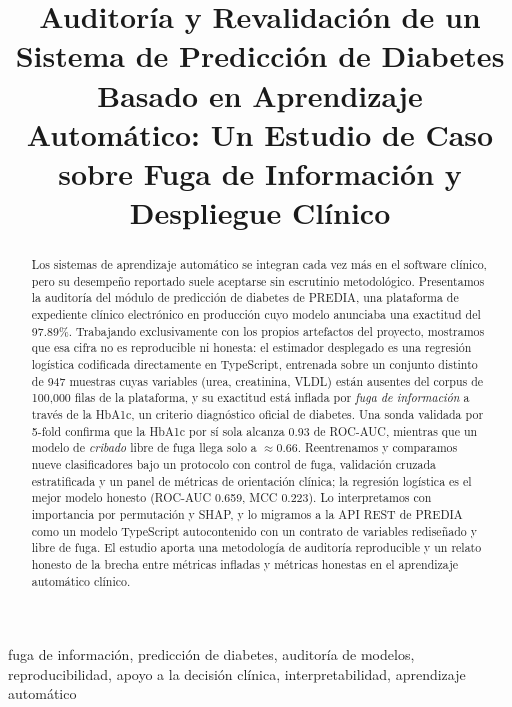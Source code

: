 \documentclass[conference]{IEEEtran}
\begin{document}
\title{Auditoría y Revalidación de un Sistema de Predicción de Diabetes
Basado en Aprendizaje Automático: Un Estudio de Caso sobre Fuga de
Información y Despliegue Clínico}

\author{%
}

\maketitle

\begin{abstract}
Los sistemas de aprendizaje automático se integran cada vez más en el software
clínico, pero su desempeño reportado suele aceptarse sin escrutinio
metodológico. Presentamos la auditoría del módulo de predicción de diabetes de
PREDIA, una plataforma de expediente clínico electrónico en producción cuyo
modelo anunciaba una exactitud del 97.89\%. Trabajando exclusivamente con los
propios artefactos del proyecto, mostramos que esa cifra no es reproducible ni
honesta: el estimador desplegado es una regresión logística codificada
directamente en TypeScript, entrenada sobre un conjunto distinto de 947 muestras
cuyas variables (urea, creatinina, VLDL) están ausentes del corpus de 100{,}000
filas de la plataforma, y su exactitud está inflada por \emph{fuga de
información} a través de la HbA1c, un criterio diagnóstico oficial de diabetes.
Una sonda validada por 5-fold confirma que la HbA1c por sí sola alcanza 0.93 de
ROC-AUC, mientras que un modelo de \emph{cribado} libre de fuga llega solo a
$\approx$0.66. Reentrenamos y comparamos nueve clasificadores bajo un protocolo
con control de fuga, validación cruzada estratificada y un panel de métricas de
orientación clínica; la regresión logística es el mejor modelo honesto (ROC-AUC
0.659, MCC 0.223). Lo interpretamos con importancia por permutación y SHAP, y lo
migramos a la API REST de PREDIA como un modelo TypeScript autocontenido con un
contrato de variables rediseñado y libre de fuga. El estudio aporta una
metodología de auditoría reproducible y un relato honesto de la brecha entre
métricas infladas y métricas honestas en el aprendizaje automático clínico.
\end{abstract}

\begin{IEEEkeywords}
fuga de información, predicción de diabetes, auditoría de modelos,
reproducibilidad, apoyo a la decisión clínica, interpretabilidad, aprendizaje
automático
\end{IEEEkeywords}
\end{document}
